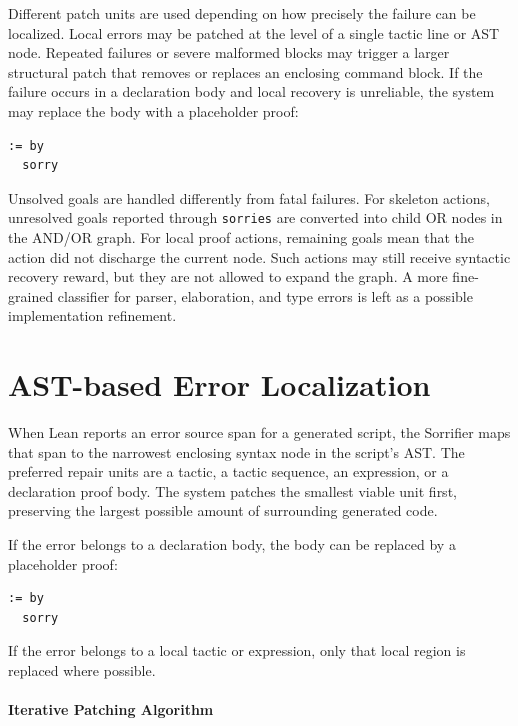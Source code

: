 \documentclass[en]{uet_awesome_thesis/uet-awesome-thesis}
\begin{document}
Different patch units are used depending on how precisely the failure can be localized. Local errors may
be patched at the level of a single tactic line or AST node. Repeated failures or severe malformed blocks
may trigger a larger structural patch that removes or replaces an enclosing command block. If the failure
occurs in a declaration body and local recovery is unreliable, the system may replace the body with a
placeholder proof:
\begin{verbatim}
:= by
  sorry
\end{verbatim}

Unsolved goals are handled differently from fatal failures. For skeleton actions, unresolved goals reported
through \texttt{sorries} are converted into child OR nodes in the AND/OR graph. For local proof
actions, remaining goals mean that the action did not discharge the current node. Such actions may still
receive syntactic recovery reward, but they are not allowed to expand the graph. A more fine-grained
classifier for parser, elaboration, and type errors is left as a possible implementation refinement.

\section{AST-based Error Localization}

When Lean reports an error source span for a generated script, the Sorrifier maps that span to the narrowest enclosing syntax node in the script's AST. The preferred repair units are a tactic, a tactic sequence, an expression, or a declaration proof body. The system patches the smallest viable unit first, preserving the largest possible amount of surrounding generated code.

If the error belongs to a declaration body, the body can be replaced by a placeholder proof:
\begin{verbatim}
:= by
  sorry
\end{verbatim}
If the error belongs to a local tactic or expression, only that local region is replaced where possible.

\paragraph{Iterative Patching Algorithm}
\end{document}
